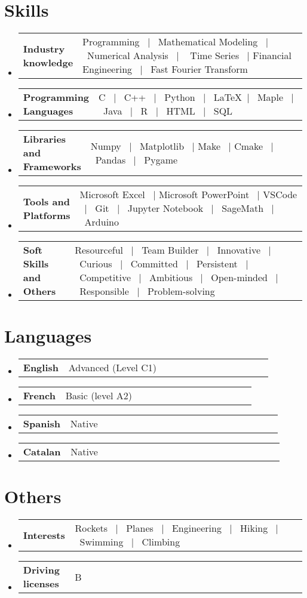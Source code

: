 \documentclass[a4paper,11pt]{article}
\newcommand{\resumeSectionTypeOne}[2]{
	\item\begin{tabular*}{0.99\textwidth}[t]{
			p{0.18\linewidth}p{0.81\linewidth}
		}
		\textbf{#1} & #2
	\end{tabular*}\vspace{-2pt}
}
\newcommand{\resumeHeadingListStart}{
	\begin{itemize}[leftmargin=0.15in, label={}]
	}
\newcommand{\resumeHeadingListEnd}{\end{itemize}}
\begin{document}
	\section{Skills}
	\resumeHeadingListStart{}
	\resumeSectionTypeOne{Industry\hspace{1cm} knowledge}{Programming \ $|$ \ Mathematical Modeling \ $|$ \ Numerical Analysis \ $|$ \ \hspace{2cm} Time Series \ $|$ Financial Engineering \ $|$ \ Fast Fourier Transform}
	\resumeHeadingListEnd{}
	
	\resumeHeadingListStart{}
	\resumeSectionTypeOne{Programming Languages}{C \ $|$ \ C++ \ $|$ \ Python \ $|$ \ \LaTeX \ $|$ \ Maple \ $|$ \ Java \ $|$ \ R \ $|$ \ HTML \ $|$ \ SQL}
	\resumeHeadingListEnd{}
	
	\resumeHeadingListStart{}
	\resumeSectionTypeOne{Libraries and Frameworks}{Numpy \ $|$ \ Matplotlib \ $|$ Make \ $|$ Cmake \ $|$  \ Pandas \ $|$  \ Pygame}
	\resumeHeadingListEnd{}
	
	\resumeHeadingListStart{}
	\resumeSectionTypeOne{Tools and\hspace{0.5cm} Platforms}{Microsoft Excel \ $|$ Microsoft PowerPoint \ $|$ VSCode \ $|$ \ Git  \ $|$ \ Jupyter Notebook \ $|$ \ SageMath \ $|$ \ Arduino}
	\resumeHeadingListEnd{}
	
	\resumeHeadingListStart{}
	\resumeSectionTypeOne{Soft Skills and Others}{Resourceful \ $|$ \ Team Builder \ $|$ \ Innovative \ $|$ \ Curious \ $|$ \ Committed \ $|$ \ Persistent \ $|$ \ Competitive \ $|$ \ Ambitious \ $|$ \ Open-minded \ $|$ \ Responsible \ $|$ \ Problem-solving}
	\resumeHeadingListEnd{}
	
	\section{Languages}
	\resumeHeadingListStart{}
	\resumeSectionTypeOne{English}{Advanced (Level C1)}
	\resumeSectionTypeOne{French}{Basic (level A2)}
	\resumeSectionTypeOne{Spanish}{Native}
	\resumeSectionTypeOne{Catalan}{Native}
	\resumeHeadingListEnd{}
	
	\section{Others}
	\resumeHeadingListStart{}
	\resumeSectionTypeOne{Interests}{Rockets \ $|$ \ Planes \ $|$ \ Engineering \ $|$ \ Hiking \ $|$ \ Swimming \ $|$ \ Climbing}
	\resumeHeadingListEnd{}
	
	\resumeHeadingListStart{}
	\resumeSectionTypeOne{Driving licenses}{B}
	\resumeHeadingListEnd{}
	
\end{document}
